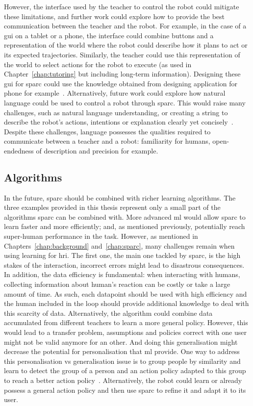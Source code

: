 However, the interface used by the teacher to control the robot could mitigate these limitations, and further work could explore how to provide the best communication between the teacher and the robot. For example, in the case of a \gls{gui} on a tablet or a phone, the interface could combine buttons and a representation of the world where the robot could describe how it plans to act or its expected trajectories. Similarly, the teacher could use this representation of the world to select actions for the robot to execute (as used in Chapter~\ref{chap:tutoring} but including long-term information). Designing these \gls{gui} for \gls{sparc} could use the knowledge obtained from designing application for phone for example~\citep{joorabchi2013real}. Alternatively, future work could explore how natural language could be used to control a robot through \gls{sparc}. This would raise many challenges, such as natural language understanding, or creating a string to describe the robot's actions, intentions or explanation clearly yet concisely~\citep{hayes2017improving}. Despite these challenges, language possesses the qualities required to communicate between a teacher and a robot: familiarity for humans, open-endedness of description and precision for example. 

\subsection{Algorithms}
In the future, \gls{sparc} should be combined with richer learning algorithms. The three examples provided in this thesis represent only a small part of the algorithms \gls{sparc} can be combined with. More advanced \gls{ml} would allow \gls{sparc} to learn faster and more efficiently; and, as mentioned previously, potentially reach super-human performance in the task. However, as mentioned in Chapters~\ref{chap:background} and~\ref{chap:sparc}, many challenges remain when using learning for \gls{hri}. The first one, the main one tackled by \gls{sparc}, is the high stakes of the interaction, incorrect errors might lead to disastrous consequences. In addition, the data efficiency is fundamental: when interacting with humans, collecting information about human's reaction can be costly or take a large amount of time. As such, each datapoint should be used with high efficiency and the human included in the loop should provide additional knowledge to deal with this scarcity of data. Alternatively, the algorithm could combine data accumulated from different teachers to learn a more general policy. However, this would lead to a transfer problem, assumptions and policies correct with one user might not be valid anymore for an other. And doing this generalisation might decrease the potential for personalisation that \gls{ml} provide. One way to address this personalisation vs generalisation issue is to group people by similarity and learn to detect the group of a person and an action policy adapted to this group to reach a better action policy~\citep{brunskill2014pac}. Alternatively, the robot could learn or already possess a general action policy and then use \gls{sparc} to refine it and adapt it to its user. 

